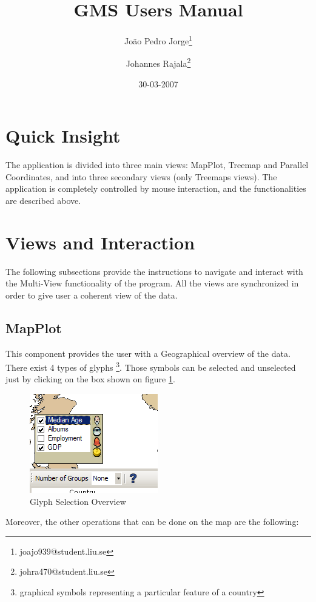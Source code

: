 \documentclass[twocolumn,8pt]{article}
\title{GMS Users Manual}
\author{Jo\~{a}o Pedro Jorge\thanks{joajo939@student.liu.se} \and Johannes Rajala\thanks{johra470@student.liu.se}}
\date{30-03-2007}
\begin{document}
\small
\maketitle

\section{Quick Insight}
The application is divided into three main views: MapPlot, Treemap and Parallel Coordinates, and into three secondary views (only Treemaps views).
The application is completely controlled by mouse interaction, and the functionalities are described above.

\section{Views and Interaction}

The following subsections provide the instructions to navigate and interact with the Multi-View functionality of the program. All the views are synchronized in order to give user a coherent view of the data.

\subsection{MapPlot}
This component provides the user with a Geographical overview of the data. There exist 4 types of glyphs \footnote{graphical symbols representing a particular feature of a country}. Those symbols can be selected and unselected just by clicking on the box shown on figure \ref{fig:glyphs}.

\begin{figure}[hbtp]
  \begin{center}
	\includegraphics[scale=0.5]{./pics/glyphs.png}
    \caption{Glyph Selection Overview}
    \label{fig:glyphs}
  \end{center}
\end{figure}

Moreover, the other operations that can be done on the map are the following:
\end{document}
